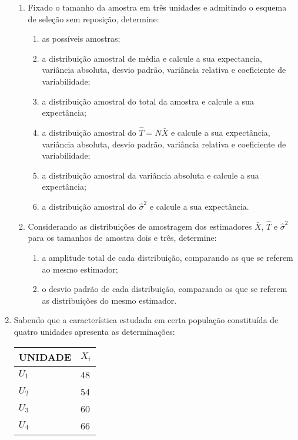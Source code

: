 \begin{enumerate}[resume]
\begin{enumerate}
	\item Fixado o tamanho da amostra em três unidades e admitindo o esquema de seleção sem reposição, determine:
		\begin{enumerate}
		\item as possíveis amostras;
		\item a distribuição amostral de média e calcule a sua expectancia, variância absoluta, desvio padrão, variância relativa e coeficiente de variabilidade;
		\item a distribuição amostral do total da amostra e calcule a sua expectância;
		\item a distribuição amostral do $\hat{T} = N\bar{X}$ e calcule a sua expectância, variância absoluta, desvio padrão, variância relativa e coeficiente de variabilidade;
		\item a distribuição amostral da variância absoluta e calcule a sua expectância;
		\item a distribuição amostral do $\hat{\sigma}^{2}$ e calcule a sua expectância.
		\end{enumerate}
		
			\item Considerando as distribuições de amostragem dos estimadores $\bar{X}$, $\hat{T}$ e $\hat{\sigma}^{2}$ para os tamanhos de amostra dois e três, determine:
		\begin{enumerate}
		\item a amplitude total de cada distribuição, comparando as que se referem ao mesmo estimador;
		\item o desvio padrão de cada distribuição, comparando os que se referem as distribuições do mesmo estimador.
		\end{enumerate}
	\end{enumerate}

\item Sabendo que a característica estudada em certa população constituída de quatro unidades apresenta as determinações:
	\begin{table}[!htb]
	\centering
	\vspace{0.5cm}
	\begin{tabular}{ll}
	UNIDADE & $X_{i}$ \\
	\hline 
	$U_{1}$ & 48 \\
	$U_{2}$ & 54 \\
	$U_{3}$ & 60 \\
	$U_{4}$ & 66 \\
	\end{tabular}
	\end{table}
	\begin{enumerate}


\end{enumerate}
\end{enumerate}
